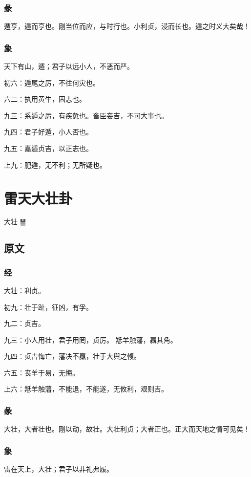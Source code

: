 \documentclass[12pt,oneside]{book}
\begin{document}
\subsection{彖}
遁亨，遁而亨也。刚当位而应，与时行也。小利贞，浸而长也。遁之时义大矣哉！

\subsection{象}
天下有山，遁；君子以远小人，不恶而严。

初六：遁尾之厉，不往何灾也。

六二：执用黄牛，固志也。

九三：系遁之厉，有疾惫也。畜臣妾吉，不可大事也。

九四：君子好遁，小人否也。

九五：嘉遁贞吉，以正志也。

上九：肥遁，无不利；无所疑也。


\chapter{雷天大壮卦}
大壮 {\Large ䷡}

\section{原文}

\subsection{经}
大壮：利贞。

初九：壮于趾，征凶，有孚。

九二：贞吉。

九三：小人用壮，君子用罔，贞厉。 羝羊触藩，羸其角。

九四：贞吉悔亡，藩决不羸，壮于大舆之輹。

六五：丧羊于易，无悔。

上六：羝羊触藩，不能退，不能遂，无攸利，艰则吉。

\subsection{彖}
大壮，大者壮也。刚以动，故壮。大壮利贞；大者正也。正大而天地之情可见矣！

\subsection{象}
雷在天上，大壮；君子以非礼弗履。
\end{document}
